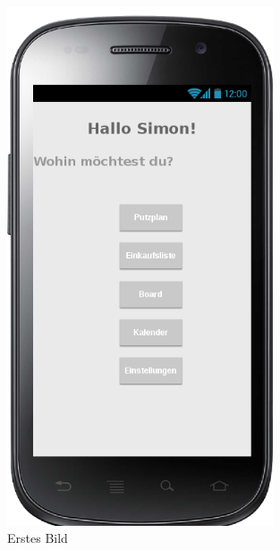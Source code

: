 \begin{figure}[H] 
  \centering
     \includegraphics[width=0.7\textwidth]{anhang/mockups/overview.png}
  \caption{Erstes Bild}
  \label{fig:Bild1}
\end{figure}

